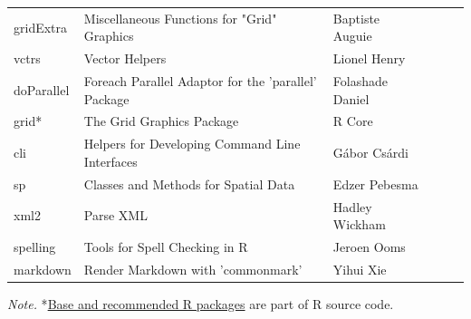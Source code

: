 \begin{table}[h]
\begin{center}
{\begin{tabular}{llllll}
 gridExtra & Miscellaneous Functions for "Grid" Graphics & Baptiste Auguie \\
 vctrs & Vector Helpers & Lionel Henry \\
 doParallel & Foreach Parallel Adaptor for the 'parallel' Package & Folashade Daniel \\
 grid* & The Grid Graphics Package &  R Core \\
 cli & Helpers for Developing Command Line Interfaces & Gábor Csárdi \\
 sp & Classes and Methods for Spatial Data & Edzer Pebesma \\
 xml2 & Parse XML & Hadley Wickham \\
 spelling & Tools for Spell Checking in R & Jeroen Ooms \\
 markdown & Render Markdown with 'commonmark' & Yihui Xie \\
\bottomrule
\end{tabular}
}

{\small
\textit{Note.} *\href{https://stat.ethz.ch/R-manual/R-devel/doc/html/packages.html}{Base and recommended R packages} are part of R source code.
}
\end{center}
\end{table}


